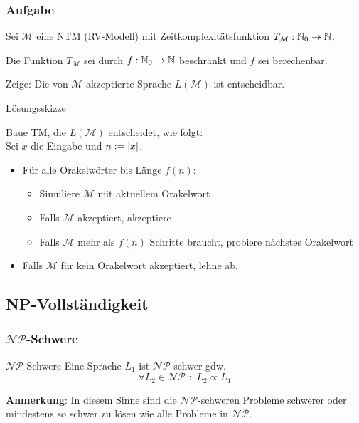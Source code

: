 \begin{frame}
	\frametitle{Aufgabe}
	
	Sei $\mathcal{M}$ eine NTM (RV-Modell) mit Zeitkomplexitätsfunktion $T_\mathcal{M} : \mathbb{N}_0 \rightarrow \mathbb{N}$.
	
	Die Funktion $T_\mathcal{M}$ sei durch $f : \mathbb{N}_0 \rightarrow \mathbb{N}$ beschränkt und $f$ sei berechenbar.
	
	Zeige: Die von $\mathcal{M}$ akzeptierte Sprache $L(\mathcal{M})$ ist entscheidbar.
	
	\invincible \pause
	\begin{block}{Lösungsskizze}
	
	Baue TM, die $L(\mathcal{M})$ entscheidet, wie folgt: \\ Sei $x$ die Eingabe und $n := \left\vert x \right\vert$.
	
	\begin{itemize}
		\item Für alle Orakelwörter bis Länge $f(n)$:
		\begin{itemize}
		\item Simuliere $\mathcal{M}$ mit aktuellem Orakelwort
		\item Falls $\mathcal{M}$ akzeptiert, akzeptiere
		\item Falls $\mathcal{M}$ mehr als $f(n)$ Schritte braucht, probiere nächstes Orakelwort
		\end{itemize}
		\item Falls $\mathcal{M}$ für kein Orakelwort akzeptiert, lehne ab.
	\end{itemize}
	\vincible
	\end{block}
\end{frame}

\subsection{NP-Vollständigkeit}
\begin{frame}
\frametitle{$\mathcal{NP}$-Schwere}
\begin{block}{$\mathcal{NP}$-Schwere}
Eine Sprache $L_1$ ist $\mathcal{NP}$-schwer gdw. 
\[\forall L_2 \in \mathcal{NP} \,\, : \,\, L_2 \propto L_1\]
\end{block}
\textbf{Anmerkung}: In diesem Sinne sind die $\mathcal{NP}$-schweren Probleme schwerer oder mindestens so schwer zu lösen wie alle Probleme in $\mathcal{NP}$.
\end{frame}

